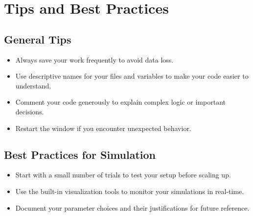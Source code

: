 \chapter{Tips and Best Practices}\label{ch:tips}

\section{General Tips}
\begin{itemize}
    \item Always save your work frequently to avoid data loss.
    \item Use descriptive names for your files and variables to make your code easier to understand.
    \item Comment your code generously to explain complex logic or important decisions.
    \item Restart the window if you encounter unexpected behavior.
\end{itemize}

\section{Best Practices for Simulation}
\begin{itemize}
    \item Start with a small number of trials to test your setup before scaling up.
    \item Use the built-in visualization tools to monitor your simulations in real-time.
    \item Document your parameter choices and their justifications for future reference.
\end{itemize}
